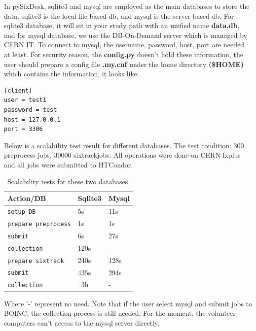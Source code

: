 In pySixDesk, sqlite3 and mysql are employed as the main databases to store the data. sqlite3 is the local file-based db, and mysql is the server-based db. For sqlite3 database, it will sit in your study path with an unified name \textbf{data.db}, and for mysql database, we use the DB-On-Demand server which is managed by CERN IT.
  To connect to mysql, the username, password, host, port are needed at least. For security reason, the \textbf{config.py} doesn't hold these information, the user should prepare a config file \textbf{.my.cnf} under the home directory \textbf{(\$HOME)} which contains the information, it looks like:
\begin{lstlisting}
[client]
user = test1
password = test
host = 127.0.0.1
port = 3306
\end{lstlisting}

Below is a scalability test result for different databases. The test condition: 300 preprocess jobs, 30000 sixtrackjobs. All operations were done on CERN lxplus and all jobs were submitted to HTCondor.
\begin{table}[h]
    \caption{Scalability tests for these two databases.}
    \label{T-ExtRou}
    \centering
    \renewcommand{\arraystretch}{1.5}
    \begin{tabular}{|l|l|l|}
        \hline
        \rowcolor{blue!30}
        \textbf{Action/DB} & \textbf{Sqlite3} & \textbf{Mysql} \\
        \hline
        \texttt{setup DB}  & 5s & 11s \\
        \hline
        \texttt{prepare preprocess}  & 1s & 1s \\
        \hline
        \texttt{submit}   & 6s    & 27s \\
        \hline
        \texttt{collection}   & 120s   & - \\
        \hline
        \texttt{prepare sixtrack}  & 240s & 128s \\
        \hline
        \texttt{submit}   & 435s    & 294s \\
        \hline
        \texttt{collection}   & ~3h   & - \\
        \hline
    \end{tabular}
\end{table}

Where '-' represent no need.
Note that if the user select mysql and submit jobs to BOINC, the collection process is still needed. For the moment, the volunteer computers can't access to the mysql server directly.

